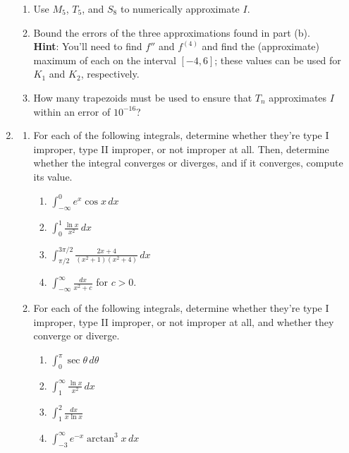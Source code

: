 \documentclass[12 pt]{article}
\newcommand{\hint}[1]{\hspace{0.5in}\textbf{Hint}: #1}
\begin{document}
\begin{enumerate}[leftmargin=0in, rightmargin=-0.25in]
\begin{enumerate}
		\item Use $M_5$, $T_5$, and $S_8$ to numerically approximate $I$.
		\item Bound the errors of the three approximations found in part (b).\\[3mm]\hint{You'll need to find $f''$ and $f^{(4)}$ and find the (approximate) maximum of each on the interval $[-4,6]$; these values can be used for $K_1$ and $K_2$, respectively.}
		\item How many trapezoids must be used to ensure that $T_n$ approximates $I$ within an error of $10^{-16}$?
	\end{enumerate}
	\item \begin{enumerate}
		\item For each of the following integrals, determine whether they're type I improper, type II improper, or not improper at all. Then, determine whether the integral converges or diverges, and if it converges, compute its value.
		\begin{enumerate}[itemsep=0.5in]
			\item $\int_{-\infty}^0 e^x \cos x\,dx$ %
			\item $\int_0^1\frac{\ln x}{x^2}\,dx$
			\item $\int_{\pi/2}^{3\pi/2}\frac{2x+4}{(x^2+1)(x^2+4)}\,dx$
			\item $\int_{-\infty}^{\infty}\frac{dx}{x^2+c}$ for $c>0$.
		\end{enumerate}
		\vspace{0.5in}
		\item For each of the following integrals, determine whether they're type I improper, type II improper, or not improper at all, and whether they converge or diverge.
		\begin{enumerate}[itemsep=0.5in]
			\item $\int_0^\pi\sec\theta\,d\theta$
			\item $\int_1^\infty \frac{\ln x}{x^2}\,dx$
			\item $\int_1^2\frac{dx}{x\ln x}$
			\item $\int_{-3}^\infty e^{-x}\arctan^3{x}\,dx$
		\end{enumerate}
		\end{enumerate}
\end{enumerate}
\end{document}
